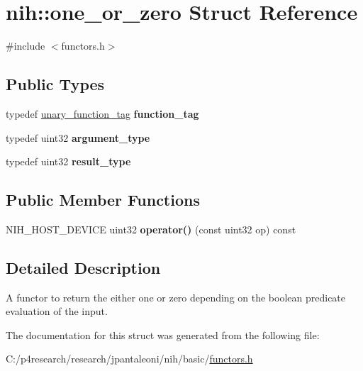 \hypertarget{structnih_1_1one__or__zero}{
\section{nih\-:\-:one\-\_\-or\-\_\-zero \-Struct \-Reference}
\label{structnih_1_1one__or__zero}
}


{\ttfamily \#include $<$functors.\-h$>$}

\subsection*{\-Public \-Types}
\begin{DoxyCompactItemize}
\item 
\hypertarget{structnih_1_1one__or__zero_adfa13107d98491f997f9933f798d043c}{
typedef \hyperlink{structnih_1_1unary__function__tag}{unary\-\_\-function\-\_\-tag} {\bfseries function\-\_\-tag}}
\label{structnih_1_1one__or__zero_adfa13107d98491f997f9933f798d043c}

\item 
\hypertarget{structnih_1_1one__or__zero_a7ec2413701c61eceba542e7eba1fcc51}{
typedef uint32 {\bfseries argument\-\_\-type}}
\label{structnih_1_1one__or__zero_a7ec2413701c61eceba542e7eba1fcc51}

\item 
\hypertarget{structnih_1_1one__or__zero_a1e3e6481b463825b53447f7fee6d28cb}{
typedef uint32 {\bfseries result\-\_\-type}}
\label{structnih_1_1one__or__zero_a1e3e6481b463825b53447f7fee6d28cb}

\end{DoxyCompactItemize}
\subsection*{\-Public \-Member \-Functions}
\begin{DoxyCompactItemize}
\item 
\hypertarget{structnih_1_1one__or__zero_aa550b53e2c4bde687f9dd58fdca56033}{
\-N\-I\-H\-\_\-\-H\-O\-S\-T\-\_\-\-D\-E\-V\-I\-C\-E uint32 {\bfseries operator()} (const uint32 op) const }
\label{structnih_1_1one__or__zero_aa550b53e2c4bde687f9dd58fdca56033}

\end{DoxyCompactItemize}


\subsection{\-Detailed \-Description}
\-A functor to return the either one or zero depending on the boolean predicate evaluation of the input. 

\-The documentation for this struct was generated from the following file\-:\begin{DoxyCompactItemize}
\item 
\-C\-:/p4research/research/jpantaleoni/nih/basic/\hyperlink{functors_8h}{functors.\-h}\end{DoxyCompactItemize}
